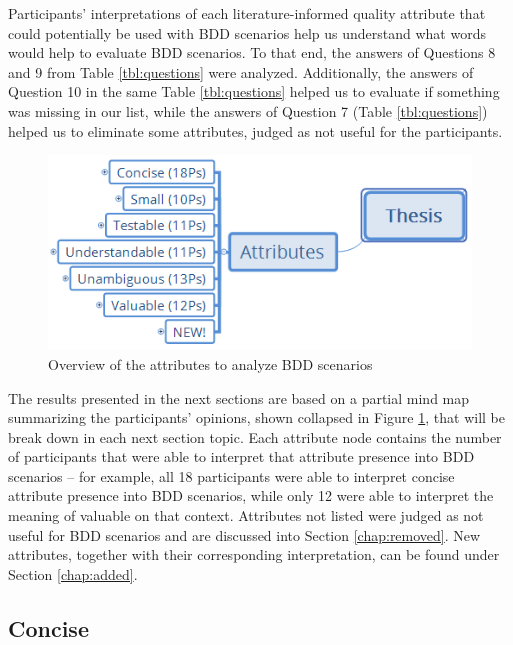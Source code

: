 Participants' interpretations of each literature-informed quality attribute that could potentially be used with BDD scenarios \cite{Empire_2017} help us understand what words would help to evaluate BDD scenarios. To that end, the answers of Questions 8 and 9 from Table \ref{tbl:questions} were analyzed. Additionally, the answers of Question 10 in the same Table \ref{tbl:questions} helped us to evaluate if something was missing in our list, while the answers of Question 7 (Table \ref{tbl:questions}) helped us to eliminate some attributes, judged as not useful for the participants.

\begin{figure}[h]
	\centering
	\includegraphics[scale=0.8]{images/overview_attribute}
	\caption{Overview of the attributes to analyze BDD scenarios}
	\label{fig:overview_attribute}
\end{figure}

The results presented in the next sections are based on a partial mind map summarizing the participants' opinions, shown collapsed in Figure \ref{fig:overview_attribute}, that will be break down in each next section topic. Each attribute node contains the number of participants that were able to interpret that attribute presence into BDD scenarios -- for example, all 18 participants were able to interpret concise attribute presence into BDD scenarios, while only 12 were able to interpret the meaning of valuable on that context. Attributes not listed were judged as not useful for BDD scenarios and are discussed into Section \ref{chap:removed}. New attributes, together with their corresponding interpretation, can be found under Section \ref{chap:added}.


\subsection{Concise}

